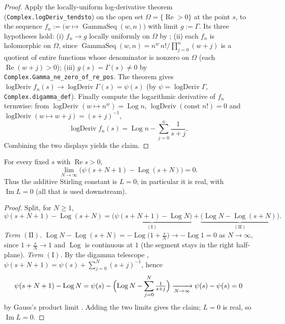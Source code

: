 \begin{proof}
\leanok
{}
Apply the locally-uniform log-derivative theorem
(\texttt{Complex.logDeriv\_tendsto}) on the open set $\Omega=\{\operatorname{Re}>0\}$
at the point $s$, to the sequence $f_n:=\bigl(w\mapsto\operatorname{GammaSeq}(w,n)\bigr)$
with limit $g:=\Gamma$. Its three hypotheses hold:
(i) $f_n\to g$ locally uniformly on $\Omega$ by ;
(ii) each $f_n$ is holomorphic on $\Omega$, since
$\operatorname{GammaSeq}(w,n)=n^{w}\,n!\big/\prod_{j=0}^{n}(w+j)$ is a quotient of
entire functions whose denominator is nonzero on $\Omega$ (each $\operatorname{Re}(w+j)>0$);
(iii) $g(s)=\Gamma(s)\neq0$ by \texttt{Complex.Gamma\_ne\_zero\_of\_re\_pos}.
The theorem gives
$\operatorname{logDeriv}f_n(s)\to\operatorname{logDeriv}\Gamma(s)=\psi(s)$
(by $\psi=\operatorname{logDeriv}\Gamma$, \texttt{Complex.digamma\_def}). Finally
compute the logarithmic derivative of $f_n$ termwise: from
$\operatorname{logDeriv}(w\mapsto n^{w})=\operatorname{Log}n$,
$\operatorname{logDeriv}(\text{const }n!)=0$ and
$\operatorname{logDeriv}(w\mapsto w+j)=(s+j)^{-1}$,
\[
  \operatorname{logDeriv}f_n(s)
   =\operatorname{Log}n-\sum_{j=0}^{n}\frac1{s+j}.
\]
Combining the two displays yields the claim.
\end{proof}

\begin{lemma}
\label{lem:gs_anchor}
\leanok
{}
For every fixed $s$ with $\operatorname{Re}s>0$,
\[
  \lim_{N\to\infty}\bigl(\psi(s+N+1)-\operatorname{Log}(s+N)\bigr)=0 .
\]
Thus the additive Stirling constant is $L=0$; in particular it is real, with
$\operatorname{Im}L=0$ (all that is used downstream).
\end{lemma}

\begin{proof}
\leanok
{}
Split, for $N\ge1$,
\[
  \psi(s+N+1)-\operatorname{Log}(s+N)
   =\underbrace{\bigl(\psi(s+N+1)-\operatorname{Log}N\bigr)}_{(\mathrm I)}
    +\underbrace{\bigl(\operatorname{Log}N-\operatorname{Log}(s+N)\bigr)}_{(\mathrm{II})}.
\]
\emph{Term $(\mathrm{II})$.} $\operatorname{Log}N-\operatorname{Log}(s+N)
=-\operatorname{Log}\bigl(1+\tfrac sN\bigr)\to-\operatorname{Log}1=0$ as $N\to\infty$,
since $1+\tfrac sN\to1$ and $\operatorname{Log}$ is continuous at $1$ (the segment
stays in the right half-plane).
\emph{Term $(\mathrm I)$.} By the digamma telescope ,
$\psi(s+N+1)=\psi(s)+\sum_{j=0}^{N}(s+j)^{-1}$, hence
\[
  \psi(s+N+1)-\operatorname{Log}N
   =\psi(s)-\Bigl(\operatorname{Log}N-\sum_{j=0}^{N}\tfrac1{s+j}\Bigr)
   \xrightarrow[N\to\infty]{}\psi(s)-\psi(s)=0
\]
by Gauss's product limit . Adding the two limits gives the claim;
$L=0$ is real, so $\operatorname{Im}L=0$.
\end{proof}

